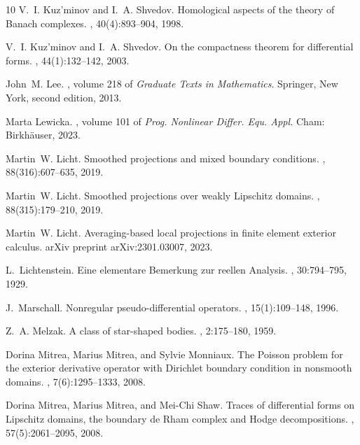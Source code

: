\documentclass[10pt,a4paper]{amsart}
\theoremstyle{definition}
\theoremstyle{remark}
\numberwithin{equation}{section}
\begin{document}
\begin{thebibliography}{10}
V.~I. Kuz'minov and I.~A. Shvedov.
\newblock Homological aspects of the theory of {Banach} complexes.
, 40(4):893--904, 1998.

V.~I. Kuz'minov and I.~A. Shvedov.
\newblock On the compactness theorem for differential forms.
, 44(1):132--142, 2003.

John~M. Lee.
, volume 218 of {\em Graduate
  Texts in Mathematics}.
\newblock Springer, New York, second edition, 2013.

Marta Lewicka.
, volume 101 of {\em Prog. Nonlinear Differ. Equ.
  Appl.}
\newblock Cham: Birkh{\"a}user, 2023.

Martin~W. Licht.
\newblock Smoothed projections and mixed boundary conditions.
, 88(316):607--635, 2019.

Martin~W. Licht.
\newblock Smoothed projections over weakly {Lipschitz} domains.
, 88(315):179--210, 2019.

Martin~W. Licht.
\newblock Averaging-based local projections in finite element exterior
  calculus.
\newblock arXiv preprint arXiv:2301.03007, 2023.

L.~Lichtenstein.
\newblock Eine elementare {Bemerkung} zur reellen {Analysis}.
, 30:794--795, 1929.

J.~Marschall.
\newblock Nonregular pseudo-differential operators.
, 15(1):109--148, 1996.

Z.~A. Melzak.
\newblock A class of star-shaped bodies.
, 2:175--180, 1959.

Dorina Mitrea, Marius Mitrea, and Sylvie Monniaux.
\newblock The {P}oisson problem for the exterior derivative operator with
  {D}irichlet boundary condition in nonsmooth domains.
, 7(6):1295--1333, 2008.

Dorina Mitrea, Marius Mitrea, and Mei-Chi Shaw.
\newblock Traces of differential forms on {Lipschitz} domains, the boundary de
  {Rham} complex and {Hodge} decompositions.
, 57(5):2061--2095, 2008.


\end{thebibliography}
\end{document}
